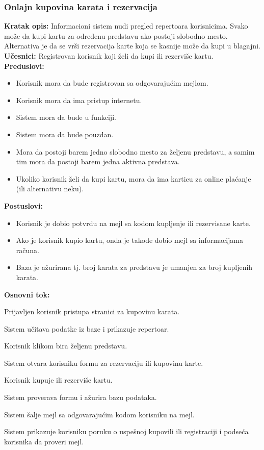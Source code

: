 \documentclass[a4paper]{article}
\begin{document}
\subsubsection{Onlajn kupovina karata i rezervacija}

\noindent\textbf{Kratak opis:} Informacioni sistem nudi pregled repertoara korisnicima. 
        Svako može da kupi kartu za određenu predstavu ako postoji slobodno mesto.
        Alternativa je da se vrši rezervacija karte koja se kasnije može da kupi u blagajni.\\

\noindent\textbf{Učesnici:} Registrovan korisnik koji želi da kupi ili rezerviše kartu.\\

\noindent\textbf{Preduslovi:} 
  \begin{itemize}
    \item Korisnik mora da bude registrovan sa odgovarajućim mejlom. 
    \item Korisnik mora da ima pristup internetu.
    \item Sistem mora da bude u funkciji.
    \item Sistem mora da bude pouzdan. 
    \item Mora da postoji barem jedno slobodno mesto za željenu predstavu, a samim tim mora da 
          postoji barem jedna aktivna predstava. 
    \item Ukoliko korisnik želi da kupi kartu, mora da ima karticu za online plaćanje (ili 
          alternativu neku).
  \end{itemize}
  
\noindent\textbf{Postuslovi:} 
  \begin{itemize}
    \item Korisnik je dobio potvrdu na mejl sa kodom kupljenje ili rezervisane karte.
    \item Ako je korisnik kupio kartu, onda je takođe dobio mejl sa informacijama računa.
    \item Baza je ažurirana tj. broj karata za predstavu je umanjen za broj kupljenih karata.
  \end{itemize}

\noindent\textbf{Osnovni tok:}
  \begin{legal}
    \item Prijavljen korisnik pristupa stranici za kupovinu karata. 
    \item Sistem učitava podatke iz baze i prikazuje repertoar.
    \item Korisnik klikom bira željenu predstavu.
    \item Sistem otvara korisniku formu za rezervaciju ili kupovinu karte.
    \item Korisnik kupuje ili rezerviše kartu.
    \item Sistem proverava formu i ažurira bazu podataka.
    \item Sistem šalje mejl sa odgovarajućim kodom korisniku na mejl.
    \item Sistem prikazuje korisniku poruku o uspešnoj kupovili ili registraciji i podseća
          korisnika da proveri mejl.
  \end{legal}
\end{document}
